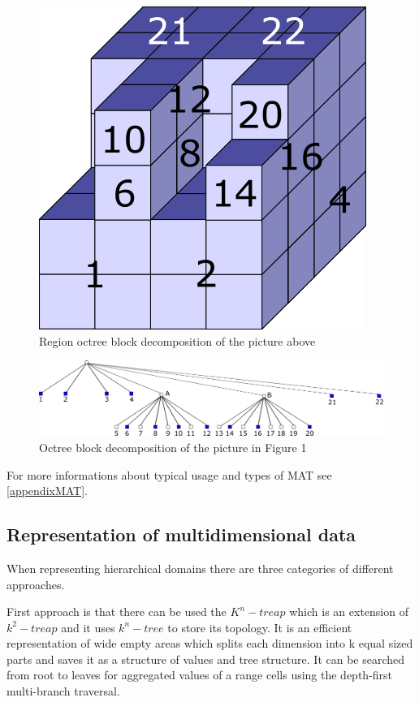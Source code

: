 \begin{figure}
\centering
\includegraphics[scale=0.5]{mat3d_todo_numbered.png}
\caption{Region octree block decomposition of the picture above}
\end{figure}
\begin{figure}
\centering
\includegraphics[width=\textwidth]{mat3d_strom.png}
\caption{Octree block decomposition of the picture in Figure 1}
\end{figure}
For more informations about typical usage and types of MAT see \ref{appendixMAT}.


\subsection{Representation of multidimensional data}\label{represOfMultidimData}
When representing hierarchical domains there are three categories of different approaches.

First approach is that there can be used the $K^n-treap$ which is an extension of $k^2-treap$ and it uses $k^n-tree$ to store its topology. It is an efficient representation of wide empty areas which splits each dimension into k equal sized parts and saves it as a structure of values and tree structure. It can be searched from root to leaves for aggregated values of a range cells using the depth-first multi-branch traversal.

